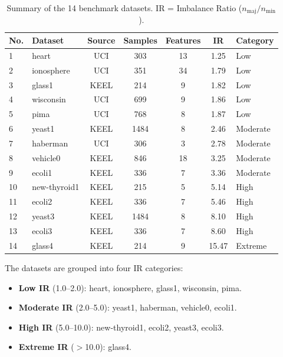\begin{table}[H]
\centering
\caption{Summary of the 14 benchmark datasets. IR = Imbalance Ratio ($n_{\text{maj}}/n_{\text{min}}$).}
\label{tab:setup:datasets}
\begin{tabular}{llccccl}
\toprule
\textbf{No.} & \textbf{Dataset} & \textbf{Source} & \textbf{Samples} & \textbf{Features} & \textbf{IR} & \textbf{Category} \\
\midrule
1  & heart         & UCI  & 303  & 13 & 1.25  & Low \\
2  & ionosphere    & UCI  & 351  & 34 & 1.79  & Low \\
3  & glass1        & KEEL & 214  & 9  & 1.82  & Low \\
4  & wisconsin     & UCI  & 699  & 9  & 1.86  & Low \\
5  & pima          & UCI  & 768  & 8  & 1.87  & Low \\
6  & yeast1        & KEEL & 1484 & 8  & 2.46  & Moderate \\
7  & haberman      & UCI  & 306  & 3  & 2.78  & Moderate \\
8  & vehicle0      & KEEL & 846  & 18 & 3.25  & Moderate \\
9  & ecoli1        & KEEL & 336  & 7  & 3.36  & Moderate \\
10 & new-thyroid1  & KEEL & 215  & 5  & 5.14  & High \\
11 & ecoli2        & KEEL & 336  & 7  & 5.46  & High \\
12 & yeast3        & KEEL & 1484 & 8  & 8.10  & High \\
13 & ecoli3        & KEEL & 336  & 7  & 8.60  & High \\
14 & glass4        & KEEL & 214  & 9  & 15.47 & Extreme \\
\bottomrule
\end{tabular}
\end{table}

The datasets are grouped into four IR categories:
\begin{itemize}[leftmargin=*]
    \item \textbf{Low IR} (1.0--2.0): heart, ionosphere, glass1, wisconsin, pima.
    \item \textbf{Moderate IR} (2.0--5.0): yeast1, haberman, vehicle0, ecoli1.
    \item \textbf{High IR} (5.0--10.0): new-thyroid1, ecoli2, yeast3, ecoli3.
    \item \textbf{Extreme IR} ($>$10.0): glass4.
\end{itemize}



